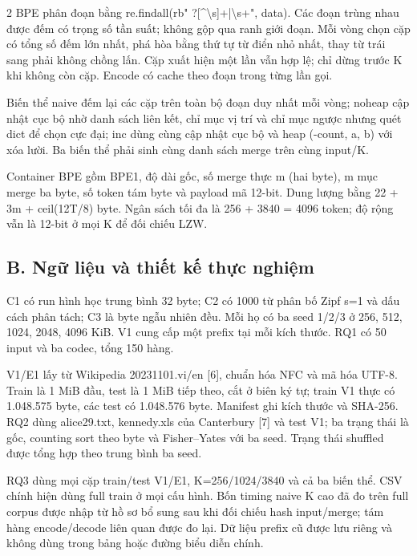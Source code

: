 \documentclass[10pt,letterpaper]{article}
\begin{document}
\begin{multicols}{2}
BPE phân đoạn bằng {\ttfamily\footnotesize re.findall(rb" ?[\textasciicircum{}\textbackslash{}s]+|\textbackslash{}s+", data)}. Các đoạn trùng nhau được đếm có trọng số tần suất; không gộp qua ranh giới đoạn. Mỗi vòng chọn cặp có tổng số đếm lớn nhất, phá hòa bằng thứ tự từ điển nhỏ nhất, thay từ trái sang phải không chồng lấn. Cặp xuất hiện một lần vẫn hợp lệ; chỉ dừng trước K khi không còn cặp. Encode có cache theo đoạn trong từng lần gọi.

Biến thể naive đếm lại các cặp trên toàn bộ đoạn duy nhất mỗi vòng; noheap cập nhật cục bộ nhờ danh sách liên kết, chỉ mục vị trí và chỉ mục ngược nhưng quét dict để chọn cực đại; inc dùng cùng cập nhật cục bộ và heap (-{}count, a, b) với xóa lười. Ba biến thể phải sinh cùng danh sách merge trên cùng input/\allowbreak{}K.

Container BPE gồm BPE1, độ dài gốc, số merge thực m (hai byte), m mục merge ba byte, số token tám byte và payload mã 12-{}bit. Dung lượng bằng 22 + 3m + ceil(12T/\allowbreak{}8) byte. Ngân sách tối đa là 256 + 3840 = 4096 token; độ rộng vẫn là 12-{}bit ở mọi K để đối chiếu LZW.

\subsection*{B. Ngữ liệu và thiết kế thực nghiệm}
C1 có run hình học trung bình 32 byte; C2 có 1000 từ phân bố Zipf s=1 và dấu cách phân tách; C3 là byte ngẫu nhiên đều. Mỗi họ có ba seed 1/\allowbreak{}2/\allowbreak{}3 ở 256, 512, 1024, 2048, 4096 KiB. V1 cung cấp một prefix tại mỗi kích thước. RQ1 có 50 input và ba codec, tổng 150 hàng.

V1/\allowbreak{}E1 lấy từ Wikipedia 20231101.vi/\allowbreak{}en [6], chuẩn hóa NFC và mã hóa UTF-{}8. Train là 1 MiB đầu, test là 1 MiB tiếp theo, cắt ở biên ký tự; train V1 thực có 1.048.575 byte, các test có 1.048.576 byte. Manifest ghi kích thước và SHA-{}256. RQ2 dùng alice29.txt, kennedy.xls của Canterbury [7] và test V1; ba trạng thái là gốc, counting sort theo byte và Fisher–Yates với ba seed. Trạng thái shuffled được tổng hợp theo trung bình ba seed.

RQ3 dùng mọi cặp train/\allowbreak{}test V1/\allowbreak{}E1, K=256/\allowbreak{}1024/\allowbreak{}3840 và cả ba biến thể. CSV chính hiện dùng full train ở mọi cấu hình. Bốn timing naive K cao đã đo trên full corpus được nhập từ hồ sơ bổ sung sau khi đối chiếu hash input/\allowbreak{}merge; tám hàng encode/\allowbreak{}decode liên quan được đo lại. Dữ liệu prefix cũ được lưu riêng và không dùng trong bảng hoặc đường biểu diễn chính.


\end{multicols}
\end{document}
